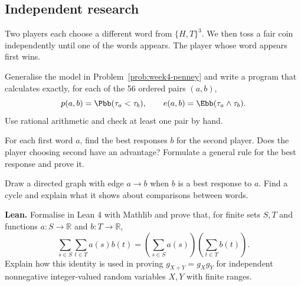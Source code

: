 \subsection*{Independent research}
\begin{researchtask}
Two players each choose a different word from $\{H,T\}^3$. We then toss a fair
coin independently until one of the words appears. The player whose word appears first wins.
\begin{enumeratea}
  \item Generalise the model in Problem~\ref{prob:week4-penney} and write a program
  that calculates exactly, for each of the 56 ordered pairs $(a,b)$,
  \[ p(a,b)=\Pbb(\tau_a<\tau_b),\qquad e(a,b)=\Ebb(\tau_a\wedge\tau_b). \]
  Use rational arithmetic and check at least one pair by hand.
  \item For each first word $a$, find the best responses $b$ for the second player.
  Does the player choosing second have an advantage? Formulate a general rule
  for the best response and prove it.
  \item Draw a directed graph with edge $a\to b$ when $b$ is a best response to
  $a$. Find a cycle and explain what it shows about comparisons between words.
\end{enumeratea}
\end{researchtask}
\noindent\textbf{Lean.} Formalise in Lean 4 with Mathlib and prove that, for
finite sets $S,T$ and functions $a:S\to\mathbb R$ and $b:T\to\mathbb R$,
\[
\sum_{s\in S}\sum_{t\in T}a(s)b(t)
=\left(\sum_{s\in S}a(s)\right)\left(\sum_{t\in T}b(t)\right).
\]
Explain how this identity is used in proving $g_{X+Y}=g_Xg_Y$ for independent
nonnegative integer-valued random variables $X,Y$ with finite ranges.
